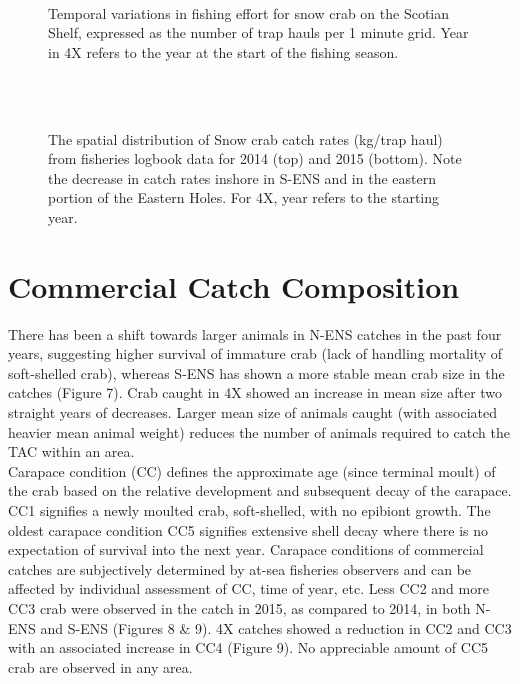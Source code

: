 \documentclass[paper=a4, fontsize=11pt]{article}
\newcommand{\D}{.}
\newcommand{\e}{/home/michelle/ecomod_data/}
\newcommand{\es}{snowcrab/}
\newcommand{\Ay}{assessments/2015/}
\begin{document}
\begin{figure}[h]
    \centering\
    \caption{Temporal variations in fishing effort for snow crab on the Scotian Shelf, expressed as the number of trap hauls per 1 minute grid. Year in 4X refers to the year at the start of the fishing season.}
\end{figure}
\begin{figure}[h]
  \centering
	\\
	\subfloat{\texttt{[image: \\e \\es maps/images/logbook/cpue2015.pdf]}}\\
	\caption{The spatial distribution of Snow crab catch rates (kg/trap haul) from fisheries logbook data for 2014 (top) and 2015 (bottom). Note the decrease in catch rates inshore in S-ENS and in the eastern portion of the Eastern Holes. For 4X, year refers to the starting year.}
\end{figure}
\clearpage

\section{Commercial Catch Composition}
There has been a shift towards larger animals in N-ENS catches in the past four years, suggesting higher survival of immature crab (lack of handling mortality of soft-shelled crab), whereas S-ENS has shown a more stable mean crab size in the catches (Figure 7). Crab caught in 4X showed an increase in mean size after two straight years of decreases. Larger mean size of animals caught (with associated heavier mean animal weight) reduces the number of animals required to catch the TAC within an area.\\

Carapace condition (CC) defines the approximate age (since terminal moult) of the crab based on the relative development and subsequent decay of the carapace. CC1 signifies a newly moulted crab, soft-shelled, with no epibiont growth. The oldest carapace condition CC5 signifies extensive shell decay where there is no expectation of survival into the next year. Carapace conditions of commercial catches are subjectively determined by at-sea fisheries observers and can be affected by individual assessment of CC, time of year, etc.  Less CC2 and more CC3 crab were observed in the catch in 2015, as compared to 2014, in both N-ENS and S-ENS (Figures 8 \& 9). 4X catches showed a reduction in CC2 and CC3 with an associated increase in CC4 (Figure 9). No appreciable amount of CC5 crab are observed in any area.\\
\end{document}

